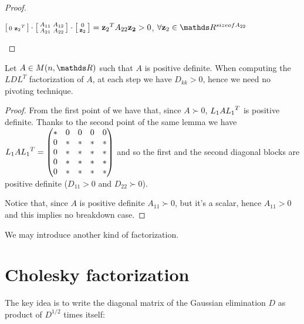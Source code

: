 \documentclass[computationalMathematics.tex]{subfiles}
\begin{document}
\begin{proof}
\begin{enumerate}
\begin{description}
      $\begin{bsmallmatrix}
        0& {\mathbf{z}_2}^{T}\\
      \end{bsmallmatrix} 
      \cdot 
      \begin{bsmallmatrix}
	      A_{11} & A_{12}\\
	      A_{21} & A_{22}
      \end{bsmallmatrix}
      \cdot 
      \begin{bsmallmatrix}
        0\\\mathbf{z}_2
      \end{bsmallmatrix}
      = {\mathbf{z}_2}^{T} A_{22} \mathbf{z_2} > 0$, $\forall \mathbf{z}_2 \in \R^{size of A_{22}}$
 
  \end{description}
   \end{enumerate}
\end{proof}

\begin{corollary}
  Let $A \in M(n, \R)$ such that $A$ is positive definite. When computing the $LDL^T$ factorization of $A$, at each step we have $D_{kk}>0$, hence we need no pivoting technique.
\end{corollary}

\begin{proof}
  From the first point of  we have that, since $A {\succ} 0$, $L_1 A {L_1}^{T}$ is positive definite. Thanks to the second point of the same lemma we have $L_1 A {L_1}^{T} = 
\begin{pmatrix}
    \ast & 0 & 0 & 0 & 0\\
    0 & \ast & \ast & \ast & \ast\\
    0 & \ast & \ast & \ast & \ast\\
    0 & \ast & \ast & \ast & \ast\\
    0 & \ast & \ast & \ast & \ast\\
\end{pmatrix}$ and so the first and the second diagonal blocks are positive definite ($D_{11} > 0$ and $D_{22} {\succ} 0$).

  Notice that, since $A$ is positive definite $A_{11} {\succ} 0$, but it's a scalar, hence $A_{11} > 0$ and this implies no breakdown case.
\end{proof}

We may introduce another kind of factorization.

\section{Cholesky factorization}
The key idea is to write the diagonal matrix of the Gaussian elimination $D$ as product of $D^{1/2}$ times itself:
\end{document}
